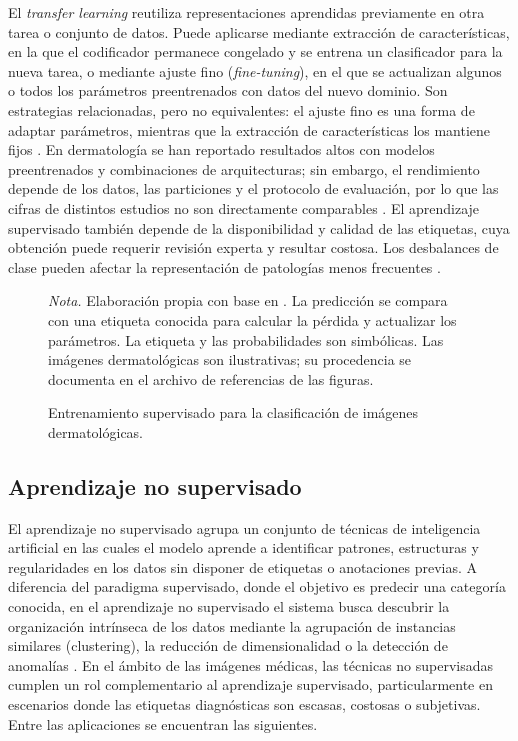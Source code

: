 El \textit{transfer learning} reutiliza representaciones aprendidas previamente en otra tarea o conjunto de datos. Puede aplicarse mediante extracción de características, en la que el codificador permanece congelado y se entrena un clasificador para la nueva tarea, o mediante ajuste fino (\textit{fine-tuning}), en el que se actualizan algunos o todos los parámetros preentrenados con datos del nuevo dominio. Son estrategias relacionadas, pero no equivalentes: el ajuste fino es una forma de adaptar parámetros, mientras que la extracción de características los mantiene fijos \parencite{raghu2019transfusion}. En dermatología se han reportado resultados altos con modelos preentrenados y combinaciones de arquitecturas; sin embargo, el rendimiento depende de los datos, las particiones y el protocolo de evaluación, por lo que las cifras de distintos estudios no son directamente comparables \parencite{alruwaili2025efficientnetresnet}. El aprendizaje supervisado también depende de la disponibilidad y calidad de las etiquetas, cuya obtención puede requerir revisión experta y resultar costosa. Los desbalances de clase pueden afectar la representación de patologías menos frecuentes \parencite{tschandl2018ham10000}.

\begin{figure}[!htbp]
\caption{Entrenamiento supervisado para la clasificación de imágenes dermatológicas.}
\label{fig:original-5}
\centering

\par\smallskip
\begingroup\footnotesize\singlespacing\raggedright
\textit{Nota.} Elaboración propia con base en \parencite{goodfellow2016deeplearning,tschandl2018ham10000}. La predicción se compara con una etiqueta conocida para calcular la pérdida y actualizar los parámetros. La etiqueta y las probabilidades son simbólicas. Las imágenes dermatológicas son ilustrativas; su procedencia se documenta en el archivo de referencias de las figuras.
\par\endgroup
\end{figure}



\subsection{Aprendizaje no supervisado}

 El aprendizaje no supervisado agrupa un conjunto de técnicas de inteligencia artificial en las cuales el modelo aprende a identificar patrones, estructuras y regularidades en los datos sin disponer de etiquetas o anotaciones previas. A diferencia del paradigma supervisado, donde el objetivo es predecir una categoría conocida, en el aprendizaje no supervisado el sistema busca descubrir la organización intrínseca de los datos mediante la agrupación de instancias similares (clustering), la reducción de dimensionalidad o la detección de anomalías \parencite{bishop2006patternrecognition}. En el ámbito de las imágenes médicas, las técnicas no supervisadas cumplen un rol complementario al aprendizaje supervisado, particularmente en escenarios donde las etiquetas diagnósticas son escasas, costosas o subjetivas. Entre las aplicaciones se encuentran las siguientes.

